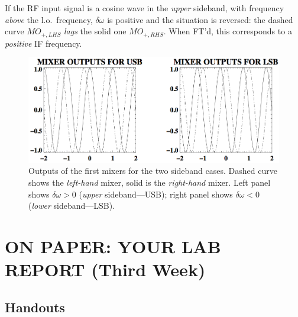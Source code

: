 \documentclass[12pt,preprint]{aastex}
\begin{document}
If the RF input signal is a cosine wave in the {\it upper} sideband, with
frequency {\it above} the l.o.\ frequency, $\delta \omega$ is positive
and the situation is
reversed: the dashed curve $MO_{+, LHS}$ {\it lags} the solid
one $MO_{+, RHS}$. When FT'd, this corresponds to a {\it positive}
IF frequency.

\begin{figure}[h]
        \includegraphics[width=6.5in]{ssbm.png}
\caption{Outputs of the first mixers for the two sideband cases. Dashed
  curve shows the {\it left-hand} mixer, solid is the {\it right-hand}
  mixer. Left panel shows $\delta \omega > 0$ ({\it upper}
  sideband---USB); right panel shows $\delta \omega < 0$ ({\it lower}
  sideband---LSB).
\label{mixerout}}
\end{figure}

\section{ON PAPER: YOUR LAB REPORT (Third Week)} \label{report}

\subsection{Handouts}
\end{document}
